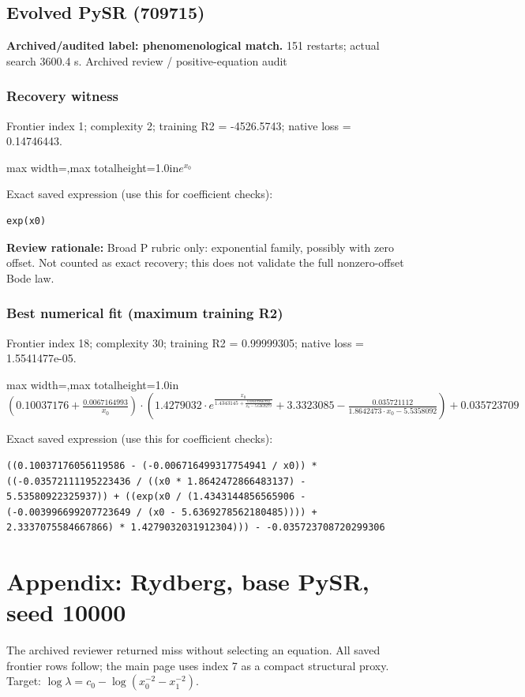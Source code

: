 \documentclass[10pt,letterpaper,landscape]{article}
\begin{document}
\begin{minipage}[t]{0.485\textwidth}
\subsection*{Evolved PySR (709715)}
\textbf{Archived/audited label: phenomenological match.} 151 restarts; actual search 3600.4 s.
{\small Archived review / positive-equation audit}
\subsubsection*{Recovery witness}
Frontier index 1; complexity 2; training R2 = -4526.5743; native loss = 0.14746443.
\begin{center}\begin{adjustbox}{max width=\linewidth,max totalheight=1.0in}$\displaystyle e^{x_{0}}$\end{adjustbox}\end{center}
{\scriptsize Exact saved expression (use this for coefficient checks):}
\begin{lstlisting}
exp(x0)
\end{lstlisting}
{\small\textbf{Review rationale:} Broad P rubric only: exponential family, possibly with zero offset. Not counted as exact recovery; this does not validate the full nonzero-offset Bode law.}
\subsubsection*{Best numerical fit (maximum training R2)}
Frontier index 18; complexity 30; training R2 = 0.99999305; native loss = 1.5541477e-05.
\begin{center}\begin{adjustbox}{max width=\linewidth,max totalheight=1.0in}$\displaystyle \left(0.10037176 + \frac{0.0067164993}{x_{0}}\right) \cdot \left(1.4279032 \cdot e^{\frac{x_{0}}{1.4343145 + \frac{0.0039966992}{x_{0} - 5.6369279}}} + 3.3323085 - \frac{0.035721112}{1.8642473 \cdot x_{0} - 5.5358092}\right) + 0.035723709$\end{adjustbox}\end{center}
{\scriptsize Exact saved expression (use this for coefficient checks):}
\begin{lstlisting}
((0.10037176056119586 - (-0.006716499317754941 / x0)) * ((-0.03572111195223436 / ((x0 * 1.8642472866483137) - 5.53580922325937)) + ((exp(x0 / (1.4343144856565906 - (-0.003996699207723649 / (x0 - 5.6369278562180485)))) + 2.3337075584667866) * 1.4279032031912304))) - -0.035723708720299306
\end{lstlisting}
\end{minipage}
\clearpage\section*{Appendix: Rydberg, base PySR, seed 10000}
The archived reviewer returned miss without selecting an equation. All saved frontier rows follow; the main page uses index 7 as a compact structural proxy. Target: $\log\lambda=c_0-\log(x_0^{-2}-x_1^{-2})$.
\end{document}
